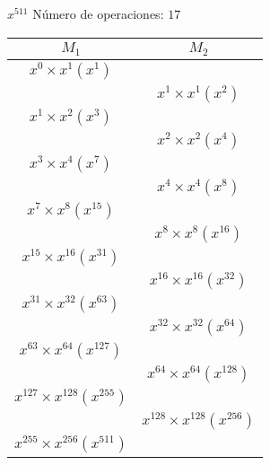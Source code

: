 \documentclass{article}
\begin{document}
\begin{multicols}{2}

        \begin{center} 
        $x^{511}$ Número de operaciones: $17$\\ 
        \begin{tabular}{|c|c|}
         \hline
           $M_1$  & $M_2$ \\ \hline
           $x^{0} \times x^{1} (x^{1})$& \\ \hline
        & $x^{1} \times x^{1} (x^{2})$ \\ \hline 
        $x^{1} \times x^{2} (x^{3})$& \\ \hline
        & $x^{2} \times x^{2} (x^{4})$ \\ \hline 
        $x^{3} \times x^{4} (x^{7})$& \\ \hline
        & $x^{4} \times x^{4} (x^{8})$ \\ \hline 
        $x^{7} \times x^{8} (x^{15})$& \\ \hline
        & $x^{8} \times x^{8} (x^{16})$ \\ \hline 
        $x^{15} \times x^{16} (x^{31})$& \\ \hline
        & $x^{16} \times x^{16} (x^{32})$ \\ \hline 
        $x^{31} \times x^{32} (x^{63})$& \\ \hline
        & $x^{32} \times x^{32} (x^{64})$ \\ \hline 
        $x^{63} \times x^{64} (x^{127})$& \\ \hline
        & $x^{64} \times x^{64} (x^{128})$ \\ \hline 
        $x^{127} \times x^{128} (x^{255})$& \\ \hline
        & $x^{128} \times x^{128} (x^{256})$ \\ \hline 
        $x^{255} \times x^{256} (x^{511})$& \\ \hline
            \end{tabular}
        \end{center}

        \columnbreak


\end{multicols}
\end{document}

